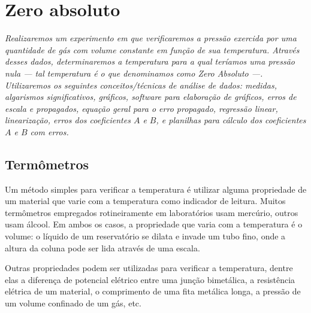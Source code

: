 \chapter{Zero absoluto}
\label{Chap:ExpZeroAbsoluto}

\begin{fullwidth}\it
	Realizaremos um experimento em que verificaremos a pressão exercida por uma quantidade de gás com volume constante em função de sua temperatura. Através desses dados, determinaremos a temperatura para a qual teríamos uma pressão nula --- tal temperatura é o que denominamos como Zero Absoluto ---. Utilizaremos os seguintes conceitos/técnicas de análise de dados: medidas, algarismos significativos, gráficos, software para elaboração de gráficos, erros de escala e propagados, equação geral para o erro propagado, regressão linear, linearização, erros dos coeficientes $A$ e $B$, e planilhas para cálculo dos coeficientes $A$ e $B$ com erros.
\end{fullwidth}

\section{Termômetros}

Um método simples para verificar a temperatura é utilizar alguma propriedade de um material que varie com a temperatura como indicador de leitura. Muitos termômetros empregados rotineiramente em laboratórios usam mercúrio, outros usam álcool. Em ambos os casos, a propriedade que varia com a temperatura é o volume: o líquido de um reservatório se dilata e invade um tubo fino, onde a altura da coluna pode ser lida através de uma escala.

Outras propriedades podem ser utilizadas para verificar a temperatura, dentre elas a diferença de potencial elétrico entre uma junção bimetálica, a resistência elétrica de um material, o comprimento de uma fita metálica longa, a pressão de um volume confinado de um gás, etc. 


